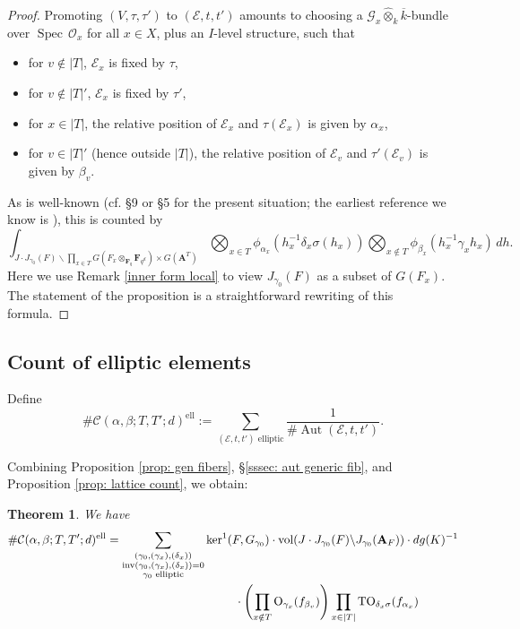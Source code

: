 \documentclass[reqno]{amsart}
\numberwithin{equation}{section}
\newcommand{\F}{\mathbf{F}}
\newcommand{\ol}[1]{\overline{#1}}
\newcommand{\wh}[1]{\widehat{#1}}
\newcommand{\Cal}[1]{\mathcal{#1}}
\newcommand{\A}{\mathbf{A}}
\newcommand{\mrm}[1]{\mathrm{#1}}
\DeclareMathOperator{\Aut}{Aut}
\DeclareMathOperator{\Spec}{Spec\,}
\DeclareMathOperator{\inv}{inv}
\newtheorem{thm}{Theorem}[section]
\theoremstyle{remark}
\numberwithin{equation}{section}
\begin{document}
\begin{proof}
Promoting $(V, \tau, \tau') $ to $(\Cal{E}, t, t')$ amounts to choosing a $\Cal{G}_x \wh{\otimes}_k \ol{k}$-bundle over $\Spec \Cal{O}_x$ for all $x \in X$, plus an $I$-level structure, such that 
\begin{itemize}
\item for $v \notin |T|$, $\Cal{E}_x$ is fixed by $\tau$, 
\item for $v \notin |T|'$, $\Cal{E}_x$ is fixed by $\tau'$, 
\item for $x \in |T|$, the relative position of $\Cal{E}_x$ and $\tau(\Cal{E}_x)$ is given by $\alpha_x$, 
\item for $v \in |T|'$ (hence outside $|T|$), the relative position of $\Cal{E}_v$ and $\tau'(\Cal{E}_v)$ is given by $\beta_v$. 
\end{itemize}
As is well-known (cf. \cite{NgoNgo} \S 9 or \cite{Ngo13} \S 5 for the present situation; the earliest reference we know is \cite{Kott80}), this is counted by 
\[
\int_{J \cdot J_{\gamma_0}(F) \backslash \prod_{x \in T} G(F_x \otimes_{\F_q} \F_{q^d}) \times G(\A^T)} \bigotimes_{x \in T} \phi_{\alpha_x}(h_x^{-1} \delta_x \sigma(h_x)) \bigotimes_{x \notin T} \phi_{\beta_x}(h_x^{-1} \gamma_x h_x) \, dh.
\]
Here we use Remark \ref{inner form local} to view $J_{\gamma_0}(F)$ as a subset of $G(F_x)$. The statement of the proposition is a straightforward rewriting of this formula. 
\end{proof}



\subsection{Count of elliptic elements}


Define
\[
\#\Cal{C}(\alpha,\beta; T,T'; d)^{\mrm{ell}} := \sum_{(\Cal{E},t, t')  \text{ elliptic}}  \frac{1}{\#\Aut(\Cal{E},t, t') }.
\]

Combining Proposition \ref{prop: gen fibers}, \S \ref{sssec: aut generic fib}, and Proposition \ref{prop: lattice count}, we obtain:  

\begin{thm}\label{thm: elliptic fixed point count} We have 
\begin{align*}
\#\Cal{C}(\alpha,\beta; T,T'; d)^{\mrm{ell}}  &= \sum_{\substack{ (\gamma_0, (\gamma_x),(\delta_x)) \\ \inv(\gamma_0, (\gamma_x),(\delta_x) ) = 0 \\ \gamma_0 \text{ elliptic}}}
\ker^1(F, G_{\gamma_0}) \cdot \mrm{vol}(J \cdot J_{\gamma_0}(F)  \backslash J_{\gamma_0} (\A_F)) \cdot dg(K)^{-1} \\ 
& \hspace{1.5in} \cdot \left( \prod_{x \notin T}  \mrm{O}_{\gamma_x}(f_{\beta_v}) \right) \prod_{x \in |T|}  \mrm{TO}_{\delta_x \sigma}(f_{\alpha_x}) 
\end{align*}
\end{thm}
\end{document}
